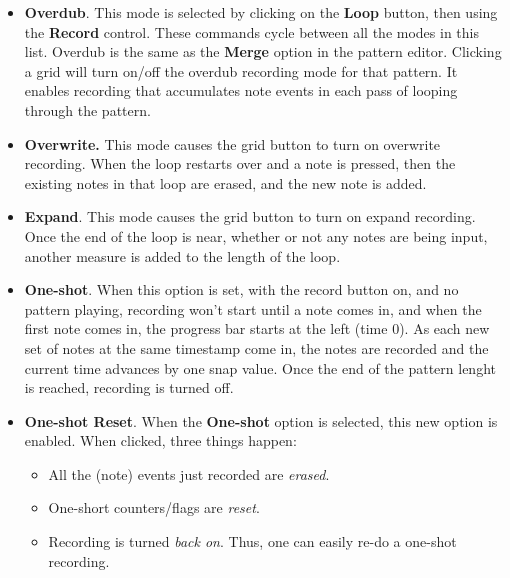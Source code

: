    \begin{itemize}
      \item \textbf{Overdub}.
         This mode is selected by clicking on the \textbf{Loop} button,
         then using the \textbf{Record} control.
         These commands cycle between all the modes in this list.
         Overdub is the same as the \textbf{Merge} option in the 
         pattern editor.
         Clicking a grid will turn on/off the overdub recording mode
         for that pattern.
         It enables recording that accumulates note events in each pass of
         looping through the pattern.
      \item \textbf{Overwrite.}
         This mode causes the grid button to turn on overwrite recording.
         When the loop restarts over and a note is pressed,
         then the existing notes in that loop are erased,
         and the new note is added.
      \item \textbf{Expand}.
         This mode causes the grid button to turn on expand recording.
         Once the end of the loop is near, whether or
         not any notes are being input, another measure is added to the length
         of the loop.
      \item \textbf{One-shot}.
         When this option is set, with the record button on, and no pattern
         playing, recording won't start until a note comes in, and when the
         first note comes in, the progress bar starts at the left (time 0).
         As each new set of notes at the same timestamp come in, the
         notes are recorded and the current time advances by one snap value.
         Once the end of the pattern lenght is reached, recording is turned
         off.
      \item \textbf{One-shot Reset}.
         When the \textbf{One-shot} option is selected, this new option
         is enabled.
         When clicked, three things happen:
         \begin{itemize}
            \item All the (note) events just recorded are \textsl{erased}.
            \item One-short counters/flags are \textsl{reset}.
            \item Recording is turned \textsl{back on}.
               Thus, one can easily re-do a one-shot recording.
         \end{itemize}
   \end{itemize}

